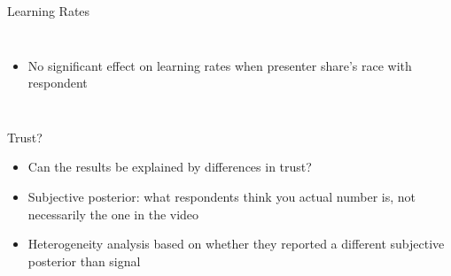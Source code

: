 \documentclass[10pt]{beamer}
\begin{document}
\begin{frame}{Learning Rates}
\begin{columns}
{}
\begin{itemize}
\item No significant effect on learning rates when presenter share's race with respondent
\end{itemize}
\end{columns}
\vspace{-0.5cm}
  \hfill \hyperlink{mainII_reg}{}  
\end{frame}

\begin{frame}{Trust?}
\begin{itemize}
    \item Can the results be explained by differences in trust?
    \item Subjective posterior: what respondents think you actual number is, not necessarily the one in the video
    \item Heterogeneity analysis based on whether they reported a different subjective posterior than signal
\end{itemize}
\end{frame}
\end{document}
